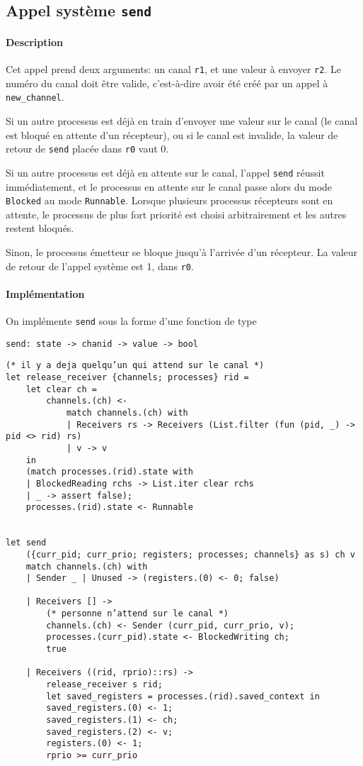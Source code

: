 \documentclass[french, toc]{../cs-classes/cs-classes}
\begin{document}
\subsection{Appel système \texttt{send}}
\paragraph*{Description} 
Cet appel prend deux arguments: un canal \texttt{r1}, et une valeur à envoyer \texttt{r2}. Le numéro du canal doit être valide, c'est-à-dire avoir été créé par un appel à \texttt{new\_channel}. 

Si un autre processus est déjà en train d'envoyer une valeur sur le canal (le canal est bloqué en attente d'un récepteur), ou si le canal est invalide, la valeur de retour de \texttt{send} placée dans \texttt{r0} vaut 0. 

Si un autre processus est déjà en attente sur le canal, l'appel \texttt{send} réussit immédiatement, et le processus en attente sur le canal passe alors du mode \texttt{Blocked} au mode \texttt{Runnable}. Lorsque plusieurs processus récepteurs sont en attente, le processus de plus fort priorité est choisi arbitrairement et les autres restent bloqués.

Sinon, le processus émetteur se bloque jusqu'à l'arrivée d'un récepteur. La valeur de retour de l'appel système est 1, dans \texttt{r0}.

\paragraph*{Implémentation} On implémente \texttt{send} sous la forme d'une fonction de type
\begin{center}
    \texttt{send: state -> chanid -> value -> bool}
\end{center}

\begin{verbatim}
(* il y a deja quelqu’un qui attend sur le canal *)
let release_receiver {channels; processes} rid =
    let clear ch =
        channels.(ch) <-
            match channels.(ch) with
            | Receivers rs -> Receivers (List.filter (fun (pid, _) -> pid <> rid) rs)
            | v -> v
    in
    (match processes.(rid).state with
    | BlockedReading rchs -> List.iter clear rchs
    | _ -> assert false);
    processes.(rid).state <- Runnable


let send
    ({curr_pid; curr_prio; registers; processes; channels} as s) ch v
    match channels.(ch) with
    | Sender _ | Unused -> (registers.(0) <- 0; false)

    | Receivers [] ->
        (* personne n’attend sur le canal *)
        channels.(ch) <- Sender (curr_pid, curr_prio, v);
        processes.(curr_pid).state <- BlockedWriting ch;
        true

    | Receivers ((rid, rprio)::rs) ->
        release_receiver s rid;
        let saved_registers = processes.(rid).saved_context in
        saved_registers.(0) <- 1;
        saved_registers.(1) <- ch;
        saved_registers.(2) <- v;
        registers.(0) <- 1;
        rprio >= curr_prio
\end{verbatim}
\end{document}
